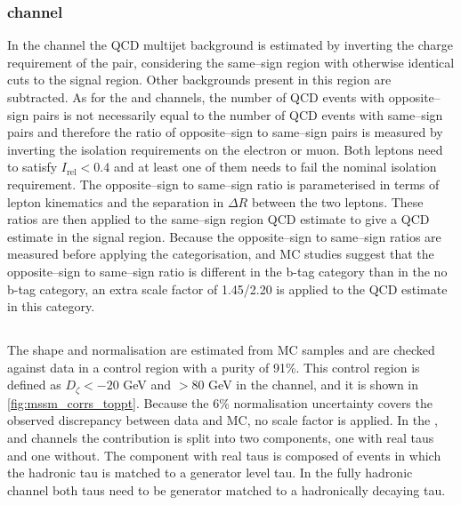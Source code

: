 \subsubsection{\texorpdfstring{\emu channel}{e mu channel}}
\label{sec:mssm_bkgs_qcd_em}
In the \emu channel the QCD multijet background
is estimated by inverting the charge requirement
of the pair, considering the same--sign region
with otherwise identical cuts to the signal region.
Other backgrounds present in this region are subtracted.
As for the \etau and \mutau channels, the number of
QCD events with opposite--sign \emu pairs is not
necessarily equal to the number of QCD events
with same--sign \emu pairs and therefore the ratio
of opposite--sign to same--sign pairs is measured by inverting
the isolation requirements on the electron or muon. Both
leptons need to satisfy $I_{\text{rel}} < 0.4$ and at 
least one of them needs to fail the nominal isolation requirement.
The opposite--sign to same--sign ratio is parameterised in terms
of lepton kinematics and the separation in $\Delta R$ between the
two leptons. These ratios are then applied to the same--sign region
QCD estimate to give a QCD estimate in the signal region. 
Because the opposite--sign to same--sign ratios are measured
before applying the categorisation, and \ac{MC} studies suggest
that the opposite--sign to same--sign ratio is different in the b-tag
category than in the no b-tag category, an extra scale factor of 
1.45/2.20 is applied to the QCD estimate in this category.


\subsection{\texorpdfstring{\ttbar}{ttbar}}
\label{sec:mssm_bkgs_tt}
The \ttbar shape and normalisation are estimated from \ac{MC} 
samples and are checked against data in a control
region with a \ttbar purity of 91\%. This control region
is defined as $D_{\zeta} < -20$ GeV and \MET $>80$ GeV in 
the \emu channel, and it is shown in \ref{fig:mssm_corrs_toppt}.
Because the 6\%
\ttbar normalisation uncertainty covers the observed
discrepancy between data and \ac{MC}, no scale factor is applied.
In the \mutau, \etau and \tautau channels
the \ttbar contribution is split into
two components, one with real taus and 
one without. The component with real taus is composed
of \ttbar events in which the hadronic tau is matched
to a generator level tau. In the fully hadronic channel
both taus need to be generator matched to a hadronically
decaying tau.

